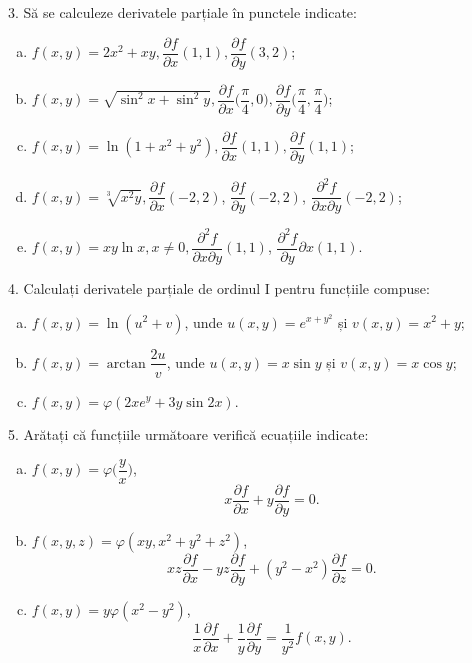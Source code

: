 3. Să se calculeze derivatele parțiale în punctele indicate:
\begin{enumerate}[(a)]
\item $ f(x, y) = 2x^2 + xy, \dfrac{\partial f}{\partial x}(1, 1), %
  \dfrac{\partial f}{\partial y} (3, 2) $;
\item $ f(x, y) = \sqrt{\sin^2 x + \sin^2 y}, \dfrac{\partial f}{\partial x} %
  \Big( \dfrac{\pi}{4}, 0 \Big), \dfrac{\partial f}{\partial y} %
  \Big( \dfrac{\pi}{4}, \dfrac{\pi}{4} \Big) $;
\item $ f(x, y) = \ln(1 + x^2 + y^2), \dfrac{\partial f}{\partial x}(1, 1), %
  \dfrac{\partial f}{\partial y}(1, 1) $;
\item $ f(x, y) = \sqrt[3]{x^2 y}, \dfrac{\partial f}{\partial x}(-2, 2) $,
  $ \dfrac{\partial f}{\partial y}(-2, 2) $, $\dfrac{\partial^2 f}{\partial x\partial y}(-2, 2) $;
\item $ f(x, y) = xy\ln x, x \neq 0, \dfrac{\partial^2 f}{\partial x\partial y}(1, 1) $,
  $ \dfrac{\partial^2 f}{\partial y}{\partial x}(1, 1) $.
\end{enumerate}

4. Calculați derivatele parțiale de ordinul I pentru funcțiile compuse:
\begin{enumerate}[(a)]
\item $ f(x, y) = \ln(u^2 + v) $, unde $u(x, y) = e^{x + y^2} $ și
  $ v(x, y) = x^2 + y $;
\item $ f(x, y) = \arctan \dfrac{2u}{v} $, unde $ u(x, y) = x\sin y $ și
  $ v(x, y) = x \cos y $;
\item $ f(x, y) = \varphi(2x e^y + 3y \sin 2x) $.
\end{enumerate}

5. Arătați că funcțiile următoare verifică ecuațiile indicate:
\begin{enumerate}[(a)]
\item $ f(x, y) = \varphi \Big( \dfrac{y}{x} \Big) $,
  \[
    x \frac{\partial f}{\partial x} + y \frac{\partial f}{\partial y} = 0.
  \]
\item $ f(x, y, z) = \varphi(xy, x^2 + y^2 + z^2) $,
  \[
    xz \frac{\partial f}{\partial x} - yz \frac{\partial f}{\partial y} + %
    (y^2 - x^2) \frac{\partial f}{\partial z} = 0.
  \]
\item $ f(x, y) = y \varphi(x^2 - y^2) $,
  \[
    \frac{1}{x} \frac{\partial f}{\partial x} + \frac{1}{y} \frac{\partial f}{\partial y} = %
    \frac{1}{y^2} f(x, y).
  \]
\end{enumerate}


